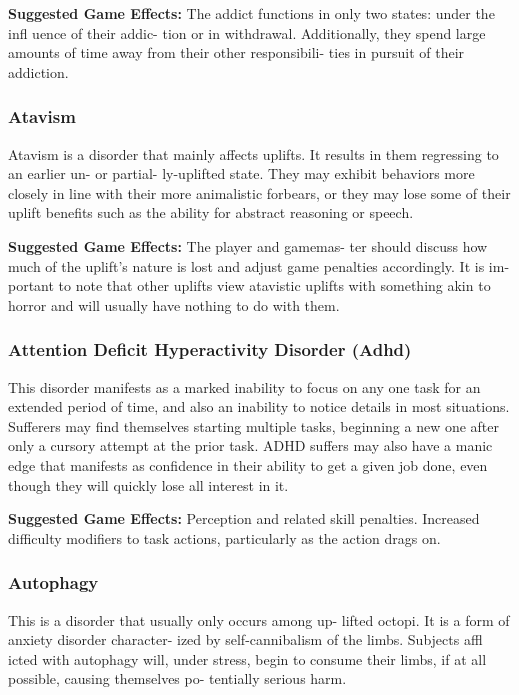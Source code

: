 \textbf{Suggested Game Effects: }The addict functions in 
only two states: under the infl uence of their addic-
tion or in withdrawal. Additionally, they spend large 
amounts of time away from their other responsibili-
ties in pursuit of their addiction.

\subsubsection{Atavism}

Atavism is a disorder that mainly affects uplifts. It 
results in them regressing to an earlier un- or partial-
ly-uplifted state. They may exhibit behaviors more 
closely in line with their more animalistic forbears, or 
they may lose some of their uplift benefits such as the 
ability for abstract reasoning or speech.

\textbf{Suggested Game Effects: }The player and gamemas-
ter should discuss how much of the uplift's nature is 
lost and adjust game penalties accordingly. It is im-
portant to note that other uplifts view atavistic uplifts 
with something akin to horror and will usually have 
nothing to do with them.

\subsubsection{Attention Deficit Hyperactivity Disorder (Adhd)}

This disorder manifests as a marked inability to focus 
on any one task for an extended period of time, and 
also an inability to notice details in most situations. 
Sufferers may find themselves starting multiple tasks, 
beginning a new one after only a cursory attempt at 
the prior task. ADHD suffers may also have a manic 
edge that manifests as confidence in their ability to get 
a given job done, even though they will quickly lose 
all interest in it.

\textbf{Suggested Game Effects:} Perception and related 
skill penalties. Increased difficulty modifiers to task 
actions, particularly as the action drags on.

\subsubsection{Autophagy}

This is a disorder that usually only occurs among up-
lifted octopi. It is a form of anxiety disorder character-
ized by self-cannibalism of the limbs. Subjects affl icted 
with autophagy will, under stress, begin to consume 
their limbs, if at all possible, causing themselves po-
tentially serious harm.

